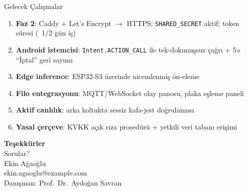 \documentclass[aspectratio=169,12pt]{beamer}
\begin{document}
\begin{frame}{Gelecek Çalışmalar}
    \begin{enumerate}
        \item \textbf{Faz 2}: Caddy + Let's Encrypt $\rightarrow$ HTTPS;
              \texttt{SHARED\_SECRET} aktif; token süresi (~1/2 gün iş)
        \item \textbf{Android istemcisi}: \texttt{Intent.ACTION\_CALL}
              ile tek-dokunuşsuz çağrı + 5\,s ``İptal'' geri sayımı
        \item \textbf{Edge inference}: ESP32-S3 üzerinde nicemlenmiş ön-eleme
        \item \textbf{Filo entegrasyonu}: MQTT/WebSocket olay panosu, plaka
              eşleme paneli
        \item \textbf{Aktif canlılık}: arka koltukta sessiz kafa-jest doğrulaması
        \item \textbf{Yasal çerçeve}: KVKK açık rıza prosedürü + yetkili
              veri tabanı erişimi
    \end{enumerate}
\end{frame}

\begin{frame}[plain]
    \begin{center}
        \vspace{1.2cm}
        {\Huge \bfseries Teşekkürler}\\[1cm]
        {\Large Sorular?}\\[2cm]
        \small Ekin Ağaoğlu \\
        ekin.agaoglu@example.com \\[6pt]  %
        Danışman: Prof.\ Dr.\ Aydoğan Savran
    \end{center}
\end{frame}
\end{document}

